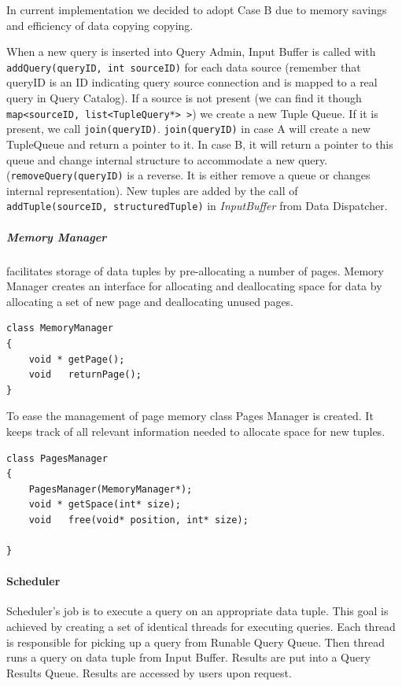 \documentclass[14pt]{article}
\begin{document}
In current implementation we decided to adopt Case B due to memory savings and efficiency of data copying copying.

When a new query is inserted into Query Admin, Input Buffer is called with {\tt addQuery(queryID, int sourceID)} for each data source (remember that queryID is an ID indicating query source connection and is mapped to a real query in Query Catalog). If a source is not present (we can find it though {\tt map<sourceID, list<TupleQuery*> >}) we create a new Tuple Queue. If it is present, we call {\tt join(queryID)}. {\tt join(queryID)} in case A will create a new TupleQueue and return a pointer to it. In case B, it will return a pointer to this queue and change internal structure to accommodate a new query. ({\tt removeQuery(queryID)} is a reverse. It is either remove a queue or changes internal representation). New tuples are added by the call of {\tt addTuple(sourceID, structuredTuple)} in \emph{InputBuffer} from Data Dispatcher.

\subparagraph{Memory Manager} facilitates storage of data tuples by pre-allocating a number of pages. Memory Manager creates an interface for allocating and deallocating space for data by allocating a set of new page and deallocating unused pages. 

\begin{verbatim}
class MemoryManager
{
    void * getPage();
	void   returnPage();
}
\end{verbatim}

\noindent To ease the management of page memory class Pages Manager is created. It keeps track of all relevant information needed to allocate space for new tuples.

\begin{verbatim}
class PagesManager
{
    PagesManager(MemoryManager*);
    void * getSpace(int* size);
    void   free(void* position, int* size);
    
}
\end{verbatim}

\paragraph{Scheduler}

Scheduler's job is to execute a query on an appropriate data tuple. This goal is achieved by creating a set of identical threads for executing queries. Each thread is responsible for picking up a query from Runable Query Queue. Then thread runs a query on data tuple from Input Buffer. Results are put into a Query Results Queue. Results are accessed by users upon request.
\end{document}
